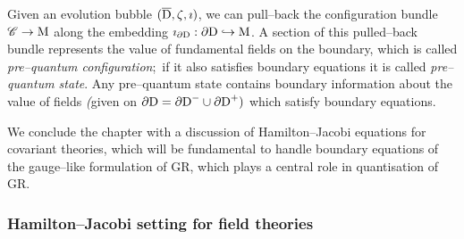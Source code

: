 \begin{defi}\label{prequantum_states}
Given an evolution bubble $(\overline{\text{\normalfont D}},\zeta,\imath)$, we can pull--back the configuration bundle $\mathscr{C}\to\text{\normalfont M}$ along the embedding $\imath_{\partial\text{\normalfont D}}:\partial\text{\normalfont D}\hookrightarrow\text{\normalfont M}$. A section of this pulled--back bundle represents the value of fundamental fields on the boundary, which is called \emph{pre--quantum configuration};\, if it also satisfies boundary equations it is called \emph{pre--quantum state}. Any pre--quantum state contains boundary information about the value of fields \emph{(}given on $\partial\text{\normalfont D}=\partial\text{\normalfont D}^-\cup\partial\text{\normalfont D}^+)$ which satisfy boundary equations.
\end{defi}

We conclude the chapter with a discussion of Hamilton--Jacobi equations for covariant theories, which will be fundamental to handle boundary equations of the gauge--like formulation of GR, which plays a central role in quantisation of GR.






\subsubsection{Hamilton--Jacobi setting for field theories}\label{HJ}

